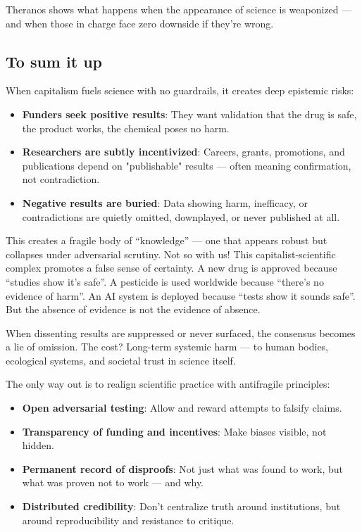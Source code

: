 \documentclass{article}
\begin{document}
Theranos shows what happens when the appearance of science is weaponized — and when those in charge face
zero downside if they’re wrong.

\cite{USvsHolmes2022}
\cite{buzzfeednews2018}
\cite{justivegove-theranos}

\subsection{To sum it up}

When capitalism fuels science with no guardrails, it creates deep epistemic risks:
\begin{itemize}
	\item \textbf{Funders seek positive results}: They want validation that the drug is safe, the product works, the chemical poses no harm.
	\item \textbf{Researchers are subtly incentivized}: Careers, grants, promotions, and publications depend on "publishable" results — often meaning confirmation, not contradiction.
	\item \textbf{Negative results are buried}: Data showing harm, inefficacy, or contradictions are quietly omitted, downplayed, or never published at all.
\end{itemize}

This creates a fragile body of “knowledge” — one that appears robust but collapses under adversarial scrutiny. Not so with us!  This capitalist-scientific complex promotes a false sense of certainty. A new drug is approved because “studies show it’s safe”. A pesticide is used worldwide because “there’s no evidence of harm”. An AI system is deployed because “tests show it sounds safe”. But the absence of evidence is not the evidence of absence. 

When dissenting results are suppressed or never surfaced, the consensus becomes a lie of omission. The cost? Long-term systemic harm — to human bodies, ecological systems, and societal trust in science itself.

The only way out is to realign scientific practice with antifragile principles:
\begin{itemize}
	\item \textbf{Open adversarial testing}: Allow and reward attempts to falsify claims.
	\item \textbf{Transparency of funding and incentives}: Make biases visible, not hidden.
	\item \textbf{Permanent record of disproofs}: Not just what was found to work, but what was proven not to work — and why.
	\item \textbf{Distributed credibility}: Don’t centralize truth around institutions, but around reproducibility and resistance to critique.
\end{itemize}
\end{document}
